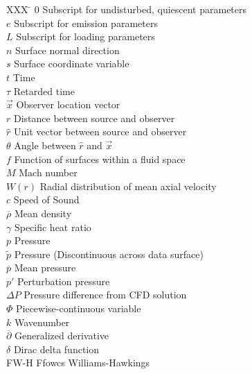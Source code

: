 \documentclass[]{aiaa-tc}%
\begin{document}
\begin{multicols}{2}
\begin{tabbing}
  XXX \= \kill%
  $0$                 \> Subscript for undisturbed, quiescent parameters \\
  $e$                 \> Subscript for emission parameters \\
  $L$                 \> Subscript for loading parameters \\
  $n$                 \> Surface normal direction \\
  $s$                 \> Surface coordinate variable \\
  $t$                 \> Time \\
  $\tau$              \> Retarded time \\
  $\vec{x}$           \> Observer location vector \\
  $r$                 \> Distance between source and observer \\
  $\hat{r}$           \> Unit vector between source and observer \\
  $\theta$            \> Angle between $\hat{r}$ and $\vec{x}$ \\
  $f$                 \> Function of surfaces within a fluid space \\
  $M$                 \> Mach number \\
  $W(r)$              \> Radial distribution of mean axial velocity \\
  $c$                 \> Speed of Sound\\
  $\overline{\rho}$   \> Mean density \\
  $\gamma$            \> Specific heat ratio \\
  $p$                 \> Pressure  \\
  $\widetilde{p}$     \> Pressure (Discontinuous across data surface)  \\
  $\overline{p}$      \> Mean pressure \\
  $p'$                \> Perturbation pressure \\
  $\Delta P$          \> Pressure difference from CFD solution \\
  $\Phi$              \> Piecewise-continuous variable \\
  $k$                 \> Wavenumber \\
  $\overline{\partial}$ \> Generalized derivative \\
  $\delta$            \> Dirac delta function \\
  \scriptsize{FW-H}   \> Ffowcs Williams-Hawkings\\

\end{tabbing}
\end{multicols}
\end{document}
